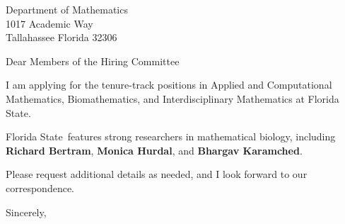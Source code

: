 




	
	
	\def\School{Florida State}
	
	\begin{letter}
		{Department of Mathematics\\
			1017 Academic Way\\
			Tallahassee Florida 32306
			
		}
		
		\opening{Dear Members of the Hiring Committee}
		
		
		I am applying for the tenure-track positions in Applied and Computational Mathematics, Biomathematics, and Interdisciplinary Mathematics at \School. 
		
		
		
		\School~features strong researchers in mathematical biology, including \textbf{Richard Bertram}, \textbf{Monica Hurdal}, and \textbf{Bhargav Karamched}. 
		
		
		
		
		
		Please request additional details as needed, and I look forward to our correspondence.
		
		\closing{Sincerely,}
	\end{letter}
